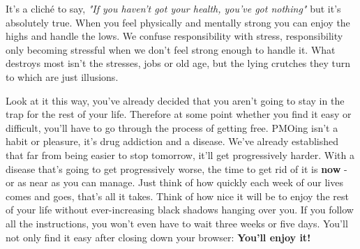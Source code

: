 \documentclass[easypeasy.tex]{subfiles}
\begin{document}
It's a cliché to say, \textit{"If you haven't got your health, you've got nothing"} but it's absolutely true. When you feel physically and mentally strong you can enjoy the highs and handle the lows. We confuse responsibility with stress, responsibility only becoming stressful when we don't feel strong enough to handle it. What destroys most isn't the stresses, jobs or old age, but the lying crutches they turn to which are just illusions.

Look at it this way, you've already decided that you aren't going to stay in the trap for the rest of your life. Therefore at some point whether you find it easy or difficult, you'll have to go through the process of getting free. PMOing isn't a habit or pleasure, it's drug addiction and a disease. We've already established that far from being easier to stop tomorrow, it'll get progressively harder. With a disease that's going to get progressively worse, the time to get rid of it is \textbf{now} - or as near as you can manage. Just think of how quickly each week of our lives comes and goes, that's all it takes. Think of how nice it will be to enjoy the rest of your life without ever-increasing black shadows hanging over you. If you follow all the instructions, you won't even have to wait three weeks or five days. You'll not only find it easy after closing down your browser: \textbf{You'll enjoy it!}
\end{document}
